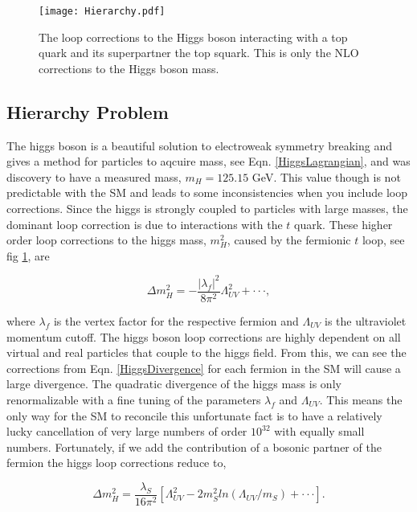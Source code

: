 \begin{figure}
 	\centering
	\texttt{[image: Hierarchy.pdf]}
 	\caption{The loop corrections to the Higgs boson interacting with a top quark and its superpartner the top squark. This is only the NLO corrections to the Higgs boson mass.}
 	\label{HiggsMass} 
\end{figure}

\subsection{Hierarchy Problem} 
The higgs boson is a beautiful solution to electroweak symmetry breaking and gives a method for particles to aqcuire mass, see Eqn. \ref{HiggsLagrangian},  and was discovery to have a measured mass, $m_{H}=125.15$ GeV. This value though is not predictable with the SM and leads to some inconsistencies when you include loop corrections. Since the higgs is strongly coupled to particles with large masses, the dominant loop correction is due to interactions with the $t$ quark. These higher order loop corrections to the higgs mass, $m_H^2$, caused by the fermionic $t$ loop, see fig \ref{HiggsMass}, are

\begin{equation} \label{HiggsDivergence}
\Delta m_{H}^{2}=-\frac{|\lambda_{f}|^{2}}{8\pi^{2}}\Lambda_{UV}^{2}+\cdot\cdot\cdot,
\end{equation}

where $\lambda_f$ is the vertex factor for the respective fermion and $\Lambda_{UV}$ is the ultraviolet momentum cutoff. The higgs boson loop corrections are highly dependent on all virtual and real particles that couple to the higgs field. From this, we can see the corrections from Eqn. \ref{HiggsDivergence} for each fermion in the SM will cause a large divergence. The quadratic divergence of the higgs mass is only renormalizable with a fine tuning of the parameters $\lambda_f$ and $\Lambda_{UV}$. This means the only way for the SM to reconcile this unfortunate fact is to have a relatively lucky cancellation of very large numbers of order $10^{32}$ with equally small numbers. Fortunately, if we add the contribution of a bosonic partner of the fermion the higgs loop corrections reduce to,

\begin{equation}
\Delta m_{H}^{2}=\frac{\lambda_{S}}{16\pi^{2}}[\Lambda_{UV}^{2} - 2m_{S}^{2}ln(\Lambda_{UV}/m_{S})+\cdot\cdot\cdot].
\label{HiggsRenormalization}
\end{equation}

